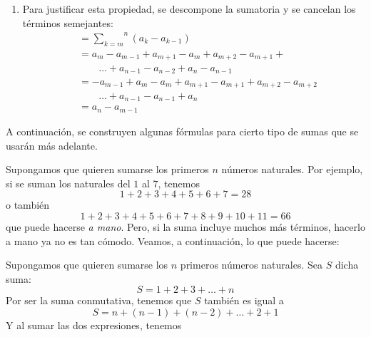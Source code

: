 \begin{enumerate}[leftmargin=1.2em, itemindent=0pt,       labelwidth=\labelwidth, labelsep=0.5em,]
\item Para justificar esta propiedad, se descompone la sumatoria y se cancelan los términos semejantes:
\begin{align*}
&=\overset{n}{\underset{k=m}{\sum }}\left( a_{k}-a_{k-1}\right)\\
&= a_{m}-a_{m-1}+ a_{m+1}-a_{m}+ a_{m+2}-a_{m+1} +\\
&\qquad \ldots + a_{n-1}-a_{n-2} + a_{n}-a_{n-1}\\
&=-a_{m-1}+ a_{m}-a_{m} + a_{m+1}-a_{m+1}+ a_{m+2}-a_{m+2} \\ 
&\qquad \ldots + a_{n-1}-a_{n-1} +a_{n}\\ 
&=a_{n}-a_{m-1}
\end{align*}


%
%
%
%
%
%

\end{enumerate}

A continuación, se construyen algunas fórmulas para cierto tipo de sumas que se usarán más adelante.

\begin{ejemplo}
\textnormal {Supongamos que quieren sumarse los primeros $n$ números naturales. Por ejemplo, si se suman los naturales del $1$ al $7$, tenemos
\[
1+2+3+4+5+6+7=28
\]
o también
\[
1+2+3+4+5+6+7+8+9+10+11=66
\]
que puede hacerse} \textit{a mano}. \textnormal {Pero, si la suma incluye muchos más términos, hacerlo a mano ya no es tan cómodo. Veamos, a continuación, lo que puede hacerse:}
\end{ejemplo}

Supongamos que quieren sumarse los $n$ primeros números naturales. Sea $S$ dicha suma:
\[
S=1+2+3+\ldots +n
\]
Por ser la suma conmutativa, tenemos que $S$ también es igual a
\[
S=n+\left( n-1\right) +\left( n-2\right) +\ldots +2+1
\]
Y al sumar las dos expresiones, tenemos


